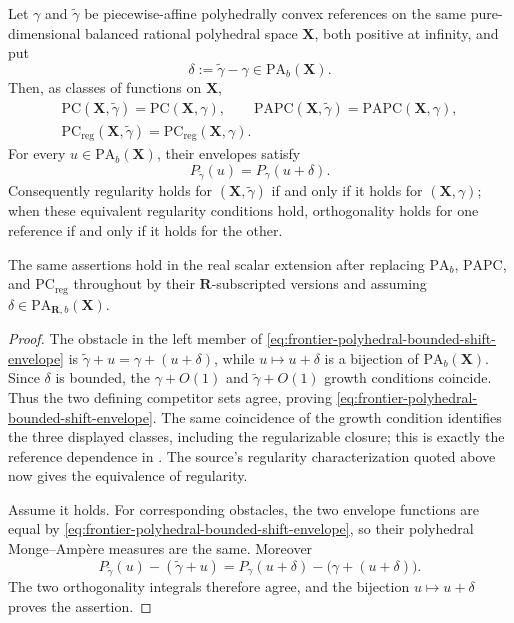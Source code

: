 \begin{proposition}\label{prop:frontier-polyhedral-bounded-reference-shift}
Let \(\gamma\) and \(\widetilde\gamma\) be piecewise-affine
polyhedrally convex references on the same pure-dimensional balanced
rational polyhedral space \(\mathbf X\), both positive at infinity, and put
\[
             \delta:=\widetilde\gamma-\gamma\in
             \mathrm{PA}_{b}(\mathbf X).
\]
Then, as classes of functions on \(\mathbf X\),
\[
\begin{gathered}
 \mathrm{PC}(\mathbf X,\widetilde\gamma)
 =\mathrm{PC}(\mathbf X,\gamma),\qquad
 \mathrm{PAPC}(\mathbf X,\widetilde\gamma)
 =\mathrm{PAPC}(\mathbf X,\gamma),\\
 \mathrm{PC}_{\mathrm{reg}}(\mathbf X,\widetilde\gamma)
 =\mathrm{PC}_{\mathrm{reg}}(\mathbf X,\gamma).
\end{gathered}
\]
For every \(u\in\mathrm{PA}_{b}(\mathbf X)\), their envelopes satisfy
\[
 P_{\widetilde\gamma}(u)=P_\gamma(u+\delta).
 \tag{\(\star\)}\label{eq:frontier-polyhedral-bounded-shift-envelope}
\]
Consequently regularity holds for \((\mathbf X,\widetilde\gamma)\) if and
only if it holds for \((\mathbf X,\gamma)\); when these equivalent
regularity conditions hold, orthogonality holds for one reference if and
only if it holds for the other.

The same assertions hold in the real scalar extension after replacing
\(\mathrm{PA}_{b}\), \(\mathrm{PAPC}\), and
\(\mathrm{PC}_{\mathrm{reg}}\) throughout by their
\(\mathbf R\)-subscripted versions and assuming
\(\delta\in\mathrm{PA}_{\mathbf R,b}(\mathbf X)\).
\end{proposition}

\begin{proof}
The obstacle in the left member of
\eqref{eq:frontier-polyhedral-bounded-shift-envelope} is
\(
 \widetilde\gamma+u=\gamma+(u+\delta)
\), while \(u\mapsto u+\delta\) is a bijection of
\(\mathrm{PA}_{b}(\mathbf X)\).  Since \(\delta\) is bounded, the
\(\gamma+O(1)\) and \(\widetilde\gamma+O(1)\) growth conditions coincide.
Thus the two defining competitor sets agree, proving
\eqref{eq:frontier-polyhedral-bounded-shift-envelope}.  The same coincidence
of the growth condition identifies the three displayed classes, including
the regularizable closure; this is exactly the reference dependence in
\cite[Definitions~3.14 and~3.23]{BMPS26}.  The source's regularity
characterization quoted above now gives the equivalence of regularity.

Assume it holds.  For corresponding obstacles, the two envelope functions
are equal by \eqref{eq:frontier-polyhedral-bounded-shift-envelope}, so their
polyhedral Monge--Amp\`ere measures are the same.  Moreover
\[
 P_{\widetilde\gamma}(u)-(\widetilde\gamma+u)
 =P_\gamma(u+\delta)-\bigl(\gamma+(u+\delta)\bigr).
\]
The two orthogonality integrals therefore agree, and the bijection
\(u\mapsto u+\delta\) proves the assertion.
\end{proof}

